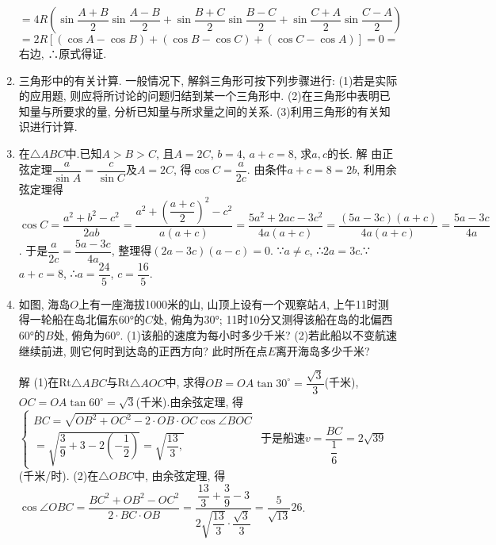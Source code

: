\documentclass[10pt,a4paper]{article}
\begin{document}
\begin{enumerate}[1.]
$=4R(\sin \dfrac{A+B}2\sin \dfrac{A-B}2+\sin \dfrac{B+C}2\sin \dfrac{B-C}2+\sin \dfrac{C+A}2\sin \dfrac{C-A}2)$
$=2R[(\cos A-\cos B)+(\cos B-\cos C)+(\cos C-\cos A)]=0=$右边,
∴原式得证.
\item 三角形中的有关计算.
一般情况下, 解斜三角形可按下列步骤进行:
(1)若是实际的应用题, 则应将所讨论的问题归结到某一个三角形中.
(2)在三角形中表明已知量与所要求的量, 分析已知量与所求量之间的关系.
(3)利用三角形的有关知识进行计算.
\item 在$\triangle ABC$中.已知$A>B>C$, 且$A=2C$, $b=4$, $a+c=8$, 求$a,c$的长.
解  由正弦定理$\dfrac a{\sin A}=\dfrac c{\sin C}$及$A=2C$, 得$\cos C=\dfrac a{2c}$.
由条件$a+c=8=2b$, 利用余弦定理得
$\cos C=\dfrac{a^2+b^2-c^2}{2ab}=\dfrac{a^2+(\dfrac{a+c}2)^2-c^2}{a(a+c)}=\dfrac{5a^2+2ac-3c^2}{4a(a+c)}=\dfrac {(5a-3c)(a+c)}{4a(a+c)}=\dfrac{5a-3c}{4a}$.
于是$\dfrac a{2c}=\dfrac{5a-3c}{4a}$, 整理得$(2a-3c)(a-c)=0$.
∵$a\ne c$, ∴$2a=3c$.∵$a+c=8$, ∴$a=\dfrac{24}5$, $c=\dfrac{16}5$.
\item 如图, 海岛$O$上有一座海拔1000米的山, 山顶上设有一个观察站$A$, 上午11时测得一轮船在岛北偏东60°的$C$处, 俯角为30°; 11时10分又测得该船在岛的北偏西60°的$B$处, 俯角为60°.
(1)该船的速度为每小时多少千米?
(2)若此船以不变航速继续前进, 则它何时到达岛的正西方向? 此时所在点$E$离开海岛多少千米?
\begin{center}
\end{center}
解  (1)在Rt$\triangle ABC$与Rt$\triangle AOC$中, 求得$OB=OA\tan 30^\circ =\dfrac{\sqrt 3}3$(千米),
$OC=OA\tan 60^{\circ }=\sqrt 3$(千米).由余弦定理, 得
$\begin{cases} BC=\sqrt {OB^2+OC^2-2\cdot OB\cdot OC\cos \angle BOC} \\ =\sqrt {\dfrac 39+3-2(-\dfrac 12)}=\sqrt {\dfrac{13}3,}
\end{cases}$
于是船速$v=\dfrac{BC}{\dfrac 16}=2\sqrt {39}$(千米/时).
(2)在$\triangle OBC$中, 由余弦定理, 得$\cos \angle OBC=\dfrac{BC^2+OB^2-OC^2}{2\cdot BC\cdot OB}=\dfrac{\dfrac{13}3+\dfrac 39-3}{2\sqrt {\dfrac{13}3}\cdot \dfrac{\sqrt 3}3}=\dfrac 5{\sqrt {13}}{26}$.

\end{enumerate}
\end{document}
